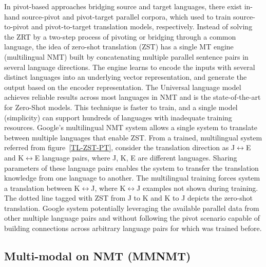 \documentclass[manuscript,screen]{acmart}
\begin{document}
In pivot-based approaches bridging source and target languages, there exist in-hand source-pivot and pivot-target parallel corpora, which used to train source-to-pivot and pivot-to-target translation models, respectively. 
Instead of solving the ZRT by a two-step process of pivoting or bridging through a common language, the idea of zero-shot translation (ZST) has a single MT engine (multilingual NMT) built by concatenating multiple parallel sentence pairs in several language directions. The engine learns to encode the inputs with several distinct languages into an underlying vector representation, and generate the output based on the encoder representation. 
The Universal language model achieves reliable results across most languages in NMT and is the state-of-the-art for Zero-Shot models. This technique is faster to train, and a single model (simplicity) can support hundreds of languages with inadequate training resources. Google's multilingual NMT system allows a single system to translate between multiple languages that enable ZST. From a trained, multilingual system referred from figure~\ref{TL-ZST-PT}, consider the translation direction as J$\leftrightarrow$E and K$\leftrightarrow$E language pairs, where J, K, E are different languages. Sharing parameters of these language pairs enables the system to transfer the translation knowledge from one language to another. The multilingual training forces system a translation between K$\leftrightarrow$J, where K$\leftrightarrow$J examples not shown during training. The dotted line tagged with ZST from J to K and K to J depicts the zero-shot translation.
Google system potentially leveraging the available parallel data from other multiple language pairs and without following the pivot scenario capable of building connections across arbitrary language pairs for which was trained before.

\subsection{Multi-modal on NMT (MMNMT)}
\end{document}
